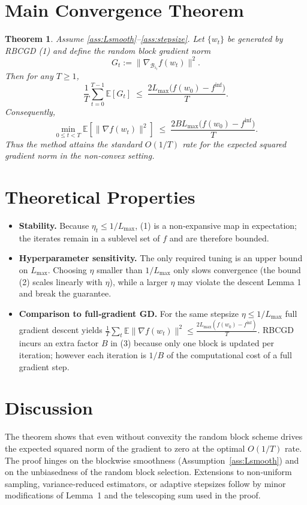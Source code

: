 \documentclass{article}
\newtheorem{theorem}{Theorem}
\begin{document}
\section*{Main Convergence Theorem}
\begin{theorem}\label{thm:main}
Assume \ref{ass:Lsmooth}--\ref{ass:stepsize}. Let $\{w_{t}\}$ be generated by RBCGD (1) and define the random block gradient norm
\[
G_{t}:=\bigl\|\nabla_{\mathcal{B}_{i_{t}}}f(w_{t})\bigr\|^{2}.
\]
Then for any $T\ge1$,
\[
\frac{1}{T}\sum_{t=0}^{T-1}\mathbb{E}\!\left[G_{t}\right]
\;\le\;
\frac{2L_{\max}\bigl(f(w_{0})-f^{\inf}\bigr)}{T}. \tag{2}
\]
Consequently,
\[
\min_{0\le t<T}\mathbb{E}\!\left[\bigl\|\nabla f(w_{t})\bigr\|^{2}\right]
\;\le\;
\frac{2BL_{\max}\bigl(f(w_{0})-f^{\inf}\bigr)}{T}. \tag{3}
\]
Thus the method attains the standard $O(1/T)$ rate for the expected squared gradient norm in the non‑convex setting.
\end{theorem}

\section*{Theoretical Properties}
\begin{itemize}
\item \textbf{Stability.} Because $\eta_{t}\le 1/L_{\max}$, (1) is a non‑expansive map in expectation; the iterates remain in a sublevel set of $f$ and are therefore bounded.
\item \textbf{Hyperparameter sensitivity.} The only required tuning is an upper bound on $L_{\max}$. Choosing $\eta$ smaller than $1/L_{\max}$ only slows convergence (the bound (2) scales linearly with $\eta$), while a larger $\eta$ may violate the descent Lemma 1 and break the guarantee.
\item \textbf{Comparison to full‑gradient GD.} For the same stepsize $\eta\le 1/L_{\max}$ full gradient descent yields
$\frac{1}{T}\sum_{t}\mathbb{E}\|\nabla f(w_{t})\|^{2}\le \frac{2L_{\max}(f(w_{0})-f^{\inf})}{T}$.
RBCGD incurs an extra factor $B$ in (3) because only one block is updated per iteration; however each iteration is $1/B$ of the computational cost of a full gradient step.
\end{itemize}

\section*{Discussion}
The theorem shows that even without convexity the random block scheme drives the expected squared norm of the gradient to zero at the optimal $O(1/T)$ rate. The proof hinges on the blockwise smoothness (Assumption~\ref{ass:Lsmooth}) and on the unbiasedness of the random block selection. Extensions to non‑uniform sampling, variance‑reduced estimators, or adaptive stepsizes follow by minor modifications of Lemma~1 and the telescoping sum used in the proof.
\end{document}
